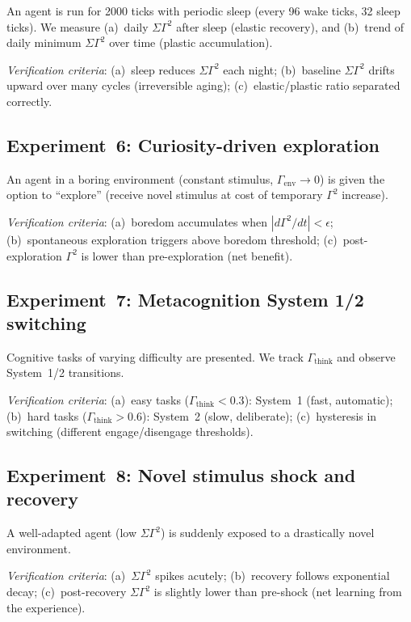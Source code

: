 ﻿\documentclass[aps,pre,twocolumn,superscriptaddress,floatfix]{revtex4-2}
\begin{document}
An agent is run for 2000 ticks with periodic sleep
(every 96 wake ticks, 32 sleep ticks).
We measure (a)~daily $\Sigma\Gamma^2$ after sleep
(elastic recovery), and (b)~trend of daily minimum
$\Sigma\Gamma^2$ over time (plastic accumulation).

\emph{Verification criteria}:
(a)~sleep reduces $\Sigma\Gamma^2$ each night;
(b)~baseline $\Sigma\Gamma^2$ drifts upward over
many cycles (irreversible aging);
(c)~elastic/plastic ratio separated correctly.


\subsection{Experiment~6: Curiosity-driven exploration}
\label{sec:exp6}

An agent in a boring environment (constant stimulus,
$\Gamma_{\mathrm{env}} \to 0$) is given the option
to ``explore'' (receive novel stimulus at cost of
temporary $\Gamma^2$ increase).

\emph{Verification criteria}:
(a)~boredom accumulates when $|d\Gamma^2/dt| < \epsilon$;
(b)~spontaneous exploration triggers above boredom
threshold;
(c)~post-exploration $\Gamma^2$ is lower than
pre-exploration (net benefit).


\subsection{Experiment~7: Metacognition System 1/2 switching}
\label{sec:exp7}

Cognitive tasks of varying difficulty are presented.
We track $\Gamma_{\mathrm{think}}$ and observe
System~1/2 transitions.

\emph{Verification criteria}:
(a)~easy tasks ($\Gamma_{\mathrm{think}} < 0.3$):
System~1 (fast, automatic);
(b)~hard tasks ($\Gamma_{\mathrm{think}} > 0.6$):
System~2 (slow, deliberate);
(c)~hysteresis in switching (different engage/disengage
thresholds).


\subsection{Experiment~8: Novel stimulus shock and recovery}
\label{sec:exp8}

A well-adapted agent (low $\Sigma\Gamma^2$) is suddenly
exposed to a drastically novel environment.

\emph{Verification criteria}:
(a)~$\Sigma\Gamma^2$ spikes acutely;
(b)~recovery follows exponential decay;
(c)~post-recovery $\Sigma\Gamma^2$ is slightly lower
than pre-shock (net learning from the experience).
\end{document}
